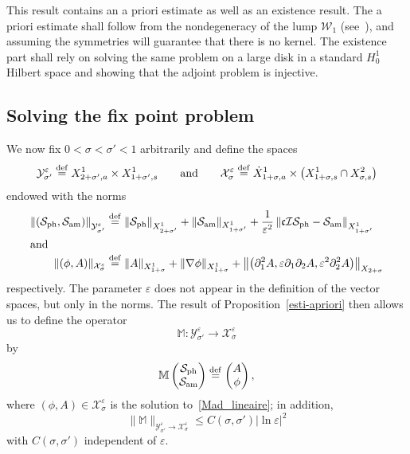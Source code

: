 \documentclass[AHL,Unicode,longabstracts,published]{cedram}
\newcommand*\p{\partial}
\newcommand{\bbM}{\mathbb{M}}
\newcommand*\ddef{\stackrel{\rm def}{=}}
\newcommand{\amm}{\mathrm{am}}
\newcommand{\phl}{\mathrm{ph}}
\newcommand*\BI{\mathcal{I}}
\newcommand*\BS{\mathcal{S}}
\newcommand*\BW{\mathcal{W}}
\newcommand*\BX{\mathcal{X}}
\newcommand*\BY{\mathcal{Y}}
\newcommand*\cs{{\mathfrak c}}
\newcommand*\ls{\leqslant }
\newcommand*\e{\varepsilon}
\newcommand*\lne{\lvert \ln \varepsilon \rvert}
\newcommand*\s{\sigma}
\begin{document}
This result contains an a priori estimate as well as an existence result. The a priori estimate shall follow from the nondegeneracy of the lump $ \BW_1 $ (see~\cite[Theorem~\ref{Lump_nondege}]{Liu_Wei_Lump}), and assuming the symmetries will guarantee that there is no kernel. The existence part shall rely on solving the same problem on a large disk in a standard $ H^1_0$ Hilbert space and showing that the adjoint problem is injective.



\subsection{Solving the fix point problem}


We now fix $ 0 < \s < \s' < 1 $ arbitrarily and define the spaces
\[
\BY^{\e}_{\s' } \ddef X^{1}_{ 2+\s', a} \times X^1_{ 1+ \s', s }
\qquad\text{and} \qquad
\BX^{\e}_{\s} \ddef \dot{X}^1_{1+\s, a} \times \left(X^1_{1+\s, s} \cap X^2_{\s, s} \right)
\]
endowed with the norms
\begin{align*}
\left\| \left(\BS_{\phl}, \BS_{\amm}\right) \right\|_{ \BY^{\e}_{\s'} }
&\ddef \left\| \BS_{\phl} \right\|_{X^1_{2+\s'}} + \| \BS_{\amm} \|_{X^1_{1+\s'}} + \frac{1}{\e^2} \left\| \cs \BI \BS_{\phl} - \BS_{\amm} \right\|_{X^1_{1+\s'}}
\\
\intertext{and}
\| (\phi, A) \|_{ \BX^\e_{\s} }
&\ddef \| A \|_{X^{1}_{ 1+\s}} + \| \nabla \phi \|_{X^{1}_{ 1+ \s}} + \left\| \left(\p_1^2 A, \e \p_1\p_2 A, \e^2 \p_2^2 A\right)\right\|_{X_{ 2+\s}}
\end{align*}
respectively. The parameter $ \e $ does not appear in the definition of the vector spaces, but only in the norms. The result of Proposition~\ref{esti-apriori} then allows us to define the operator
\[
\bbM : \BY^\e_{\s'} \to \BX^\e_{\s}
\]
by
\[
\bbM
\begin{pmatrix} \BS_{\phl} \\ \BS_{\amm}
\end{pmatrix}
\ddef
\begin{pmatrix} A \\ \phi
\end{pmatrix},
\]
where $ (\phi, A) \in \BX^\e_{\s} $ is the solution to~\eqref{Mad_lineaire}; in addition,
\[
\| \bbM \|_{ \BY^\e_{\s'} \to \BX^\e_{\s} } \ls C (\s, \s') \lne^2
\]
with $ C (\s, \s') $ independent of $ \e $.
\end{document}
